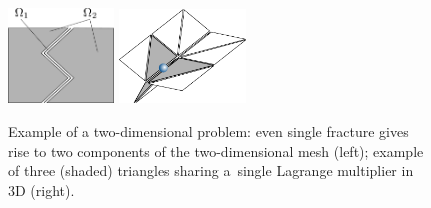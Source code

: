 \begin{figure}[tbh]
\begin{center}
\includegraphics[width=0.25\textwidth]{figs/components} \hspace{25mm} 
\includegraphics[width=0.30\textwidth]{figs/starlike-conf}
\end{center}
\caption{\label{fig:schemes}
Example of a two-dimensional problem: even single fracture gives rise to two components of the two-dimensional mesh (left);
example of three (shaded) triangles sharing a~single Lagrange multiplier in 3D (right).}
\end{figure}





